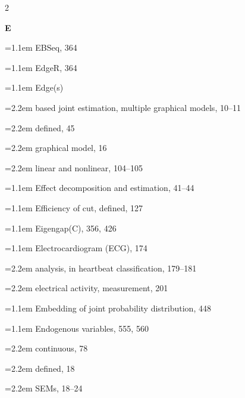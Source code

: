 \begin{multicols}{2}
\par{}\medskip\noindent\textbf{E}\par\nobreak\smallskip\nobreak
\noindent\hangindent=1.1em EBSeq, 364\par
\noindent\hangindent=1.1em EdgeR, 364\par
\noindent\hangindent=1.1em Edge(s)\par
\noindent\hangindent=2.2em \hspace*{1.1em}based joint estimation, multiple graphical models, 10--11\par
\noindent\hangindent=2.2em \hspace*{1.1em}defined, 45\par
\noindent\hangindent=2.2em \hspace*{1.1em}graphical model, 16\par
\noindent\hangindent=2.2em \hspace*{1.1em}linear and nonlinear, 104--105\par
\noindent\hangindent=1.1em Effect decomposition and estimation, 41--44\par
\noindent\hangindent=1.1em Efficiency of cut, defined, 127\par
\noindent\hangindent=1.1em Eigengap(C), 356, 426\par
\noindent\hangindent=1.1em Electrocardiogram (ECG), 174\par
\noindent\hangindent=2.2em \hspace*{1.1em}analysis, in heartbeat classification, 179--181\par
\noindent\hangindent=2.2em \hspace*{1.1em}electrical activity, measurement, 201\par
\noindent\hangindent=1.1em Embedding of joint probability distribution, 448\par
\noindent\hangindent=1.1em Endogenous variables, 555, 560\par
\noindent\hangindent=2.2em \hspace*{1.1em}continuous, 78\par
\noindent\hangindent=2.2em \hspace*{1.1em}defined, 18\par
\noindent\hangindent=2.2em \hspace*{1.1em}SEMs, 18--24\par

\end{multicols}
